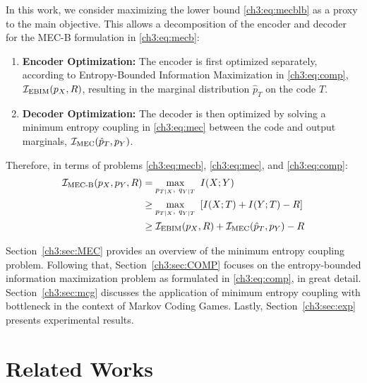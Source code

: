 In this work, we consider maximizing the lower bound \eqref{ch3:eq:mecblb} as a proxy to the main objective.
This allows a decomposition of the encoder and decoder for the MEC-B formulation in \eqref{ch3:eq:mecb}:

\begin{enumerate}
    \item \textbf{Encoder Optimization:}
    The encoder is first optimized separately, according to Entropy-Bounded Information Maximization in \eqref{ch3:eq:comp}, $\mathcal{I}_\text{EBIM}(p_X, R)$, resulting in the marginal distribution $\hat{p}_T$ on the code $T$.

    \item \textbf{Decoder Optimization:}
    The decoder is then optimized by solving a minimum entropy coupling in \eqref{ch3:eq:mec} between the code and output marginals, $\mathcal{I}_\text{MEC}(\hat{p}_T, p_Y)$.
\end{enumerate}

Therefore, in terms of problems \eqref{ch3:eq:mecb}, \eqref{ch3:eq:mec}, and \eqref{ch3:eq:comp}:
\begin{align}
    \mathcal{I}_\text{MEC-B}(p_X, p_Y, R) &= \max_{p_{T|X},\ q_{Y|T}} \ I(X;Y) \\
    &\geq \max_{p_{T|X},\ q_{Y|T}} \ \left[ I(X;T) + I(Y;T) - R \right] \\
    &\geq \mathcal{I}_\text{EBIM}(p_X, R) + \mathcal{I}_\text{MEC}(\hat{p}_T, p_Y) - R
\end{align}

Section~\ref{ch3:sec:MEC} provides an overview of the minimum entropy coupling problem. Following that, Section~\ref{ch3:sec:COMP} focuses on the entropy-bounded information maximization problem as formulated in \eqref{ch3:eq:comp}, in great detail. Section~\ref{ch3:sec:mcg} discusses the application of minimum entropy coupling with bottleneck in the context of Markov Coding Games. Lastly, Section~\ref{ch3:sec:exp} presents experimental results.


\section{Related Works}\label{ch3:sec:relatedworks}

